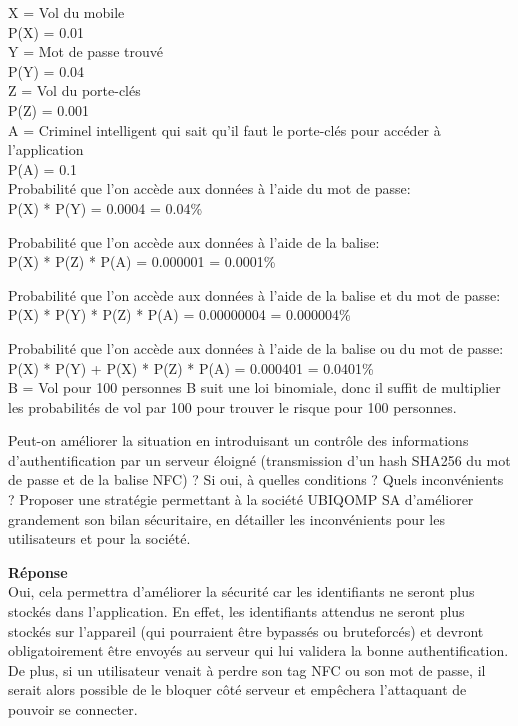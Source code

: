 \documentclass[a4paper]{article}
\begin{document}
\begin{enumerate}
    X = Vol du mobile \\
    P(X) = 0.01 \\
    
    Y = Mot de passe trouvé \\
    P(Y) = 0.04 \\
    
    Z = Vol du porte-clés \\
    P(Z) = 0.001 \\
    
    A = Criminel intelligent qui sait qu'il faut le porte-clés pour accéder à l'application \\
    P(A) = 0.1 \\
    
    
    Probabilité que l'on accède aux données à l'aide du mot de passe: \\
    P(X) * P(Y) = 0.0004 = 0.04\%
    
    Probabilité que l'on accède aux données à l'aide de la balise: \\
    P(X) * P(Z) * P(A) = 0.000001 = 0.0001\%
    
    Probabilité que l'on accède aux données à l'aide de la balise et du mot de passe: \\
    P(X) * P(Y) * P(Z) * P(A) = 0.00000004 = 0.000004\%
    
    
    Probabilité que l'on accède aux données à l'aide de la balise ou du mot de passe: \\
    P(X) * P(Y) + P(X) * P(Z) * P(A) = 0.000401 = 0.0401\% \\
    
    B = Vol pour 100 personnes
    B suit une loi binomiale, donc il suffit de multiplier les probabilités de vol par 100 pour trouver le risque pour 100 personnes.
    
    \pagebreak
    
    Peut-on améliorer la situation en introduisant un contrôle des informations d'authentification par un serveur éloigné (transmission d'un hash SHA256 du mot de passe et de la balise NFC) ? Si oui, à quelles conditions ? Quels inconvénients ?
    Proposer une stratégie permettant à la société UBIQOMP SA d'améliorer grandement son bilan
    sécuritaire, en détailler les inconvénients pour les utilisateurs et pour la société.
    
    \textbf{Réponse} \\
    Oui, cela permettra d'améliorer la sécurité car les identifiants ne seront plus stockés dans l'application. En effet, les identifiants attendus ne seront plus stockés sur l'appareil (qui pourraient être bypassés ou bruteforcés) et devront obligatoirement être envoyés au serveur qui lui validera la bonne authentification. De plus, si un utilisateur venait à perdre son tag NFC ou son mot de passe, il serait alors possible de le bloquer côté serveur et empêchera l'attaquant de pouvoir se connecter.
    

\end{enumerate}
\end{document}
